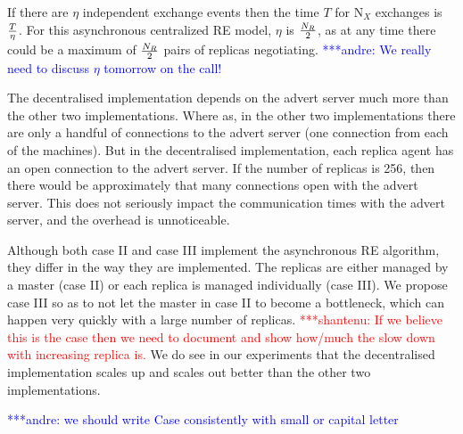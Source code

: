 \documentclass{rspublic}
\newcommand{\jhanote}[1]{ {\textcolor{red} { ***shantenu: #1 }}}
\newcommand{\alnote}[1]{ {\textcolor{blue} { ***andre: #1 }}}
\newcommand{\alnote}[1]{}
\newcommand{\jhanote}[1]{}
\begin{document}
If there are $\eta$ independent exchange events then the time $T$ for 
N$_X$ exchanges is $T \over \eta$. For this asynchronous centralized RE model, $\eta$ is $N_R \over 2$, as at any time there could be a maximum of $N_R \over 2$ pairs of replicas negotiating.  \alnote{We really need to discuss $\eta$ tomorrow on the call!}


The decentralised implementation depends on the advert server much more than the other two implementations. Where as, in the other two implementations there are only a handful of connections to the advert server (one connection from each of the machines). But in the decentralised implementation, each replica agent has an open connection to the advert server. If the number of replicas is 256, then there would be approximately that many connections open with the advert server. This does not seriously impact the communication times with the advert server, and the overhead is unnoticeable.

Although both case II and case III implement the asynchronous RE
algorithm, they differ in the way they are implemented. The replicas
are either managed by a master (case II) or each replica is managed
individually (case III). We propose case III so as to not let the
master in case II to become a bottleneck, which can happen very
quickly with a large number of replicas. \jhanote{If we believe this
  is the case then we need to document and show how/much the slow down
  with increasing replica is.} We do see in our experiments that the
decentralised implementation scales up and scales out better than the
other two implementations.


\alnote{we should write Case consistently with small or capital letter}
\end{document}
